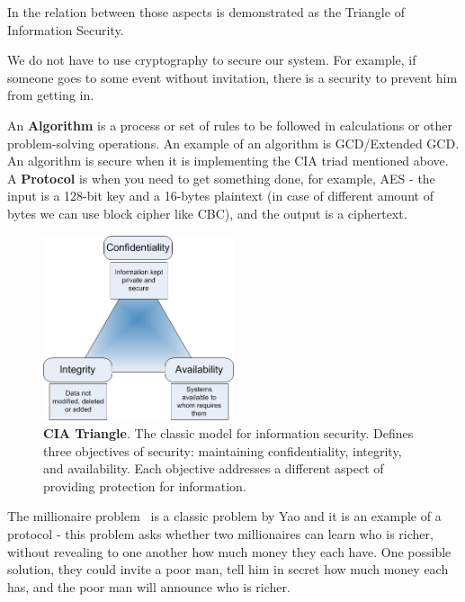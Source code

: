 In  the relation between those aspects is demonstrated as the
Triangle of Information Security.

We do not have to use cryptography to secure our system. For example, if someone
goes to some event without invitation, there is a security to prevent him from
getting in.

An \textbf{Algorithm} is a process or set of rules to be followed in
calculations or other problem-solving operations. An example of an algorithm is
GCD/Extended GCD. An algorithm is secure when it is implementing the CIA triad
mentioned above. A \textbf{Protocol} is when you need to get something done, for
example, AES -  the input is a 128-bit key and a 16-bytes plaintext (in case of
different amount of bytes we can use block cipher like CBC), and the output is a ciphertext.

\begin{figure}
    \centering
    \includegraphics[width=0.5\textwidth]{images/ch1_Intro/cia.jpg}
    \caption{\textbf{CIA Triangle}. The classic model for information security. Defines three objectives of security: maintaining confidentiality, integrity, and availability. Each objective addresses a different aspect of providing protection for information.}
    \label{fig:CIA}
\end{figure}

The millionaire problem~\cite{lin2005efficient} is a classic problem by Yao and
it is an example of a protocol - this problem asks whether two millionaires can
learn who is richer, without revealing to one another how much money they each
have. One possible solution, they could invite a poor man, tell him in secret
how much money each has, and the poor man will announce who is richer.  

